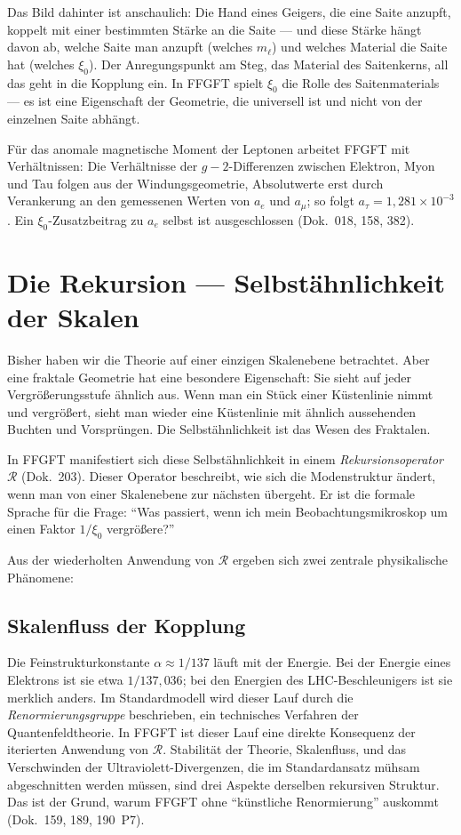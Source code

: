 Das Bild dahinter ist anschaulich: Die Hand eines Geigers, die eine
Saite anzupft, koppelt mit einer bestimmten Stärke an die Saite ---
und diese Stärke hängt davon ab, welche Saite man anzupft (welches
$m_\ell$) und welches Material die Saite hat (welches $\xi_0$). Der
Anregungspunkt am Steg, das Material des Saitenkerns, all das geht
in die Kopplung ein. In FFGFT spielt $\xi_0$ die Rolle des
Saitenmaterials --- es ist eine Eigenschaft der Geometrie, die
universell ist und nicht von der einzelnen Saite abhängt.

Für das anomale magnetische Moment der Leptonen arbeitet FFGFT mit
Verhältnissen: Die Verhältnisse der $g-2$-Differenzen zwischen
Elektron, Myon und Tau folgen aus der Windungsgeometrie, Absolutwerte
erst durch Verankerung an den gemessenen Werten von $a_e$ und $a_\mu$;
so folgt $a_\tau = 1{,}281\times10^{-3}$. Ein $\xi_0$-Zusatzbeitrag zu
$a_e$ selbst ist ausgeschlossen (Dok.~018, 158, 382).

\section{Die Rekursion --- Selbstähnlichkeit der Skalen}

Bisher haben wir die Theorie auf einer einzigen Skalenebene
betrachtet. Aber eine fraktale Geometrie hat eine besondere
Eigenschaft: Sie sieht auf jeder Vergrößerungsstufe ähnlich aus.
Wenn man ein Stück einer Küstenlinie nimmt und vergrößert, sieht
man wieder eine Küstenlinie mit ähnlich aussehenden Buchten und
Vorsprüngen. Die Selbstähnlichkeit ist das Wesen des Fraktalen.

In FFGFT manifestiert sich diese Selbstähnlichkeit in einem
\emph{Rekursionsoperator} $\mathcal{R}$ (Dok.~203). Dieser Operator
beschreibt, wie sich die Modenstruktur ändert, wenn man von einer
Skalenebene zur nächsten übergeht. Er ist die formale Sprache für
die Frage: \enquote{Was passiert, wenn ich mein Beobachtungsmikroskop
um einen Faktor $1/\xi_0$ vergrößere?}

Aus der wiederholten Anwendung von $\mathcal{R}$ ergeben sich zwei
zentrale physikalische Phänomene:

\subsection*{Skalenfluss der Kopplung}
Die Feinstrukturkonstante $\alpha \approx 1/137$ läuft mit der
Energie. Bei der Energie eines Elektrons ist sie etwa $1/137{,}036$;
bei den Energien des LHC-Beschleunigers ist sie merklich anders. Im
Standardmodell wird dieser Lauf durch die \emph{Renormierungsgruppe}
beschrieben, ein technisches Verfahren der Quantenfeldtheorie. In
FFGFT ist dieser Lauf eine direkte Konsequenz der iterierten
Anwendung von $\mathcal{R}$. Stabilität der Theorie, Skalenfluss,
und das Verschwinden der Ultraviolett-Divergenzen, die im
Standardansatz mühsam abgeschnitten werden müssen, sind drei
Aspekte derselben rekursiven Struktur. Das ist der Grund, warum
FFGFT ohne \enquote{künstliche Renormierung} auskommt (Dok.~159, 189,
190~P7).


